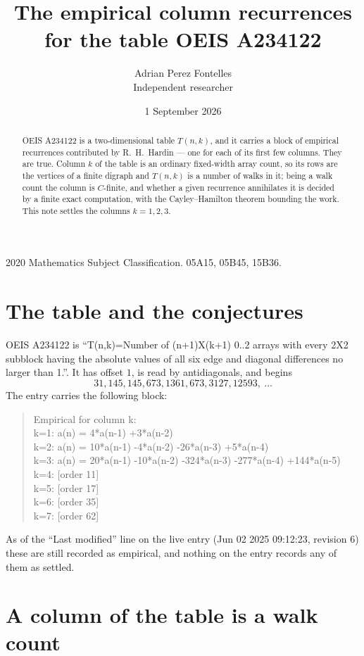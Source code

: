 \documentclass[11pt,a4paper]{article}
\title{The empirical column recurrences for the table OEIS A234122}
\author{Adrian Perez Fontelles\\ \small Independent researcher}
\date{1 September 2026}
\theoremstyle{plain}
\theoremstyle{definition}
\begin{document}
\maketitle

\begin{abstract}
OEIS A234122 is a two-dimensional table $T(n,k)$, and it carries a block of empirical
recurrences contributed by R.~H.~Hardin --- one for each of its first few columns. They are
true. Column $k$ of the table is an ordinary fixed-width array count, so its rows are the
vertices of a finite digraph and $T(n,k)$ is a number of walks in it; being a walk count the
column is $C$-finite, and whether a given recurrence annihilates it is decided by a finite
exact computation, with the Cayley--Hamilton theorem bounding the work. This note settles the
columns $k=1, 2, 3$.
\end{abstract}

\noindent\small 2020 Mathematics Subject Classification. 05A15, 05B45, 15B36.\normalsize

\section{The table and the conjectures}

OEIS A234122 is ``T(n,k)=Number of (n+1)X(k+1) 0..2 arrays with every 2X2 subblock having the absolute values of all six edge and diagonal differences no larger than 1.''. It has offset $1$, is
read by antidiagonals, and begins
\[
31, 145, 145, 673, 1361, 673, 3127, 12593,\ \dots
\]
The entry carries the following block:
\begin{quote}\small
Empirical for column k:\\
k=1: a(n) = 4*a(n-1) +3*a(n-2)\\
k=2: a(n) = 10*a(n-1) -4*a(n-2) -26*a(n-3) +5*a(n-4)\\
k=3: a(n) = 20*a(n-1) -10*a(n-2) -324*a(n-3) -277*a(n-4) +144*a(n-5)\\
k=4: [order 11]\\
k=5: [order 17]\\
k=6: [order 35]\\
k=7: [order 62]\\
\end{quote}
As of the ``Last modified'' line on the live entry (Jun 02 2025 09:12:23, revision 6) these are still
recorded as empirical, and nothing on the entry records any of them as settled.

\section{A column of the table is a walk count}
\end{document}

